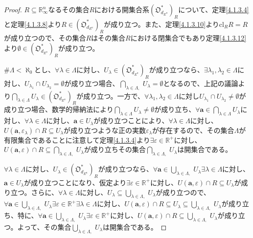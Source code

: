 \documentclass[dvipdfmx]{jsarticle}
\begin{document}
\begin{proof}
$R \subseteq \mathbb{R}_{\infty}^{n}$なるその集合$R$における開集合系$\left( \mathfrak{O}_{d_{E^{n}}}^{*} \right)_{R}$について、定理\ref{4.1.3.4}と定理\ref{4.1.3.8}より$R \in \left( \mathfrak{O}_{d_{E^{n}}}^{*} \right)_{R}$が成り立つ。また、定理\ref{4.1.3.10}より$\mathrm{cl}_{R}R = R$が成り立つので、その集合$R$はその集合$R$における閉集合でもあり定理\ref{4.1.3.12}より$\emptyset \in \left( \mathfrak{O}_{d_{E^{n}}}^{*} \right)_{R}$が成り立つ。\par
$\#\varLambda < \aleph_{0}$とし、$\forall\lambda \in \varLambda$に対し、$U_{\lambda} \in \left( \mathfrak{O}_{d_{E^{n}}}^{*} \right)_{R}$が成り立つなら、$\exists\lambda_{1},\lambda_{2} \in \varLambda$に対し、$U_{\lambda_{1}} \cap U_{\lambda_{2}} = \emptyset$が成り立つ場合、$\bigcap_{\lambda \in \varLambda ,\ } U_{\lambda} = \emptyset$となるので、上記の議論より$\bigcap_{\lambda \in \varLambda } U_{\lambda} \in \left( \mathfrak{O}_{d_{E^{n}}}^{*} \right)_{R}$が成り立つ。一方で、$\forall\lambda_{1},\lambda_{2} \in \varLambda$に対し$U_{\lambda_{1}} \cap U_{\lambda_{2}} \neq \emptyset$が成り立つ場合、数学的帰納法により$\bigcap_{\lambda \in \varLambda} U_{\lambda} \neq \emptyset$が成り立ち、$\forall\mathbf{a} \in \bigcap_{\lambda \in \varLambda } U_{\lambda}$に対し、$\forall\lambda \in \varLambda$に対し、$\mathbf{a} \in U_{\lambda}$が成り立つことにより、$\forall\lambda \in \varLambda$に対し、$U\left( \mathbf{a},\varepsilon_{\lambda} \right) \cap R \subseteq U_{\lambda}$が成り立つような正の実数$\varepsilon_{\lambda}$が存在するので、その集合$\varLambda$が有限集合であることに注意して定理\ref{4.1.3.4}より$\exists\varepsilon \in \mathbb{R}^{+}$に対し、$U\left( \mathbf{a},\varepsilon \right) \cap R \subseteq \bigcap_{\lambda \in \varLambda ,\ } U_{\lambda}$が成り立ちその集合$\bigcap_{\lambda \in \varLambda ,\ } U_{\lambda}$は開集合である。\par
$\forall\lambda \in \varLambda$に対し、$U_{\lambda} \in \left( \mathfrak{O}_{d_{E^{n}}}^{*} \right)_{R}$が成り立つなら、$\forall\mathbf{a} \in \bigcup_{\lambda \in \varLambda ,\ } U_{\lambda}\exists\lambda \in \varLambda$に対し、$\mathbf{a} \in U_{\lambda}$が成り立つことになり、仮定より$\exists\varepsilon \in \mathbb{R}^{+}$に対し、$U\left( \mathbf{a},\varepsilon \right) \cap R \subseteq U_{\lambda}$が成り立つ。さらに、$\forall\lambda \in \varLambda$に対し、$U_{\lambda} \subseteq \bigcup_{\lambda \in \varLambda ,\ } U_{\lambda}$が成り立つので、$\forall\mathbf{a} \in \bigcup_{\lambda \in \varLambda ,\ } U_{\lambda}\exists\varepsilon \in \mathbb{R}^{+}\exists\lambda \in \varLambda$に対し、$U\left( \mathbf{a},\varepsilon \right) \cap R \subseteq U_{\lambda} \subseteq \bigcup_{\lambda \in \varLambda ,\ } U_{\lambda}$が成り立ち、特に、$\forall\mathbf{a} \in \bigcup_{\lambda \in \varLambda ,\ } U_{\lambda}\exists\varepsilon \in \mathbb{R}^{+}$に対し、$U\left( \mathbf{a},\varepsilon \right) \cap R \subseteq \bigcup_{\lambda \in \varLambda ,\ } U_{\lambda}$が成り立つ。よって、その集合$\bigcup_{\lambda \in \varLambda ,\ } U_{\lambda}$は開集合である。
\end{proof}
\end{document}
